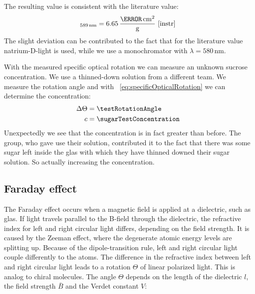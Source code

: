 \documentclass[a4paper,10pt,twocolumn]{article}
\newcommand{\unit}[1]{\, \mathrm{#1}}
\newcommand{\nm}{\unit{nm}}
\newcommand{\wavelengthYellow}{580 \nm}
\begin{document}
    The resulting value is consistent with the literature value:
    \begin{align*}
        [\alpha]_{589\nm} = 6.65 \unit{\frac{\degree \, cm^2}{g}} ~\cite{instr}
    \end{align*}
    The slight deviation can be contributed to the fact that for the literature value natrium-D-light
    is used, while we use a monochromator with $\lambda = \wavelengthYellow$.
    
    With the measured specific optical rotation we can measure an unknown sucrose concentration.
    We use a thinned-down solution from a different team.
    We measure the rotation angle and with ~\eqref{eq:specificOpticalRotation} we can determine
    the concentration:
    \begin{align*}
        \Delta \Theta &= \testRotationAngle \\
        c &= \sugarTestConcentration
     \end{align*}
    Unexpectedly we see that the concentration is in fact greater than before.
    The group, who gave use their solution, contributed it to the fact that there was some sugar left
    inside the glas with which they have thinned downed their sugar solution.
    So actually increasing the concentration.

    \subsection{Faraday effect}
    \label{subsec:Faraday}

    \newcommand{\BMean}{\bar{B}}
    \newcommand{\BMax}{B_{\mathrm{max}}}

    The Faraday effect occurs when a magnetic field is applied at a dielectric, such as glas.
    If light travels parallel to the B-field through the dielectric, the refractive index
    for left and right circular light differs, depending on the field strength.
    It is caused by the Zeeman effect, where the degenerate atomic energy levels are splitting up.
    Because of the dipole-transition rule, left and right circular light couple differently to the atoms.
    The difference in the refractive index between left and right circular light leads to a rotation
    $\Theta$ of linear polarized light.
    This is analog to chiral molecules.
    The angle $\Theta$ depends on the length of the dielectric $l$, the field strength $\BMean$ and
    the Verdet constant $V$:
\end{document}
